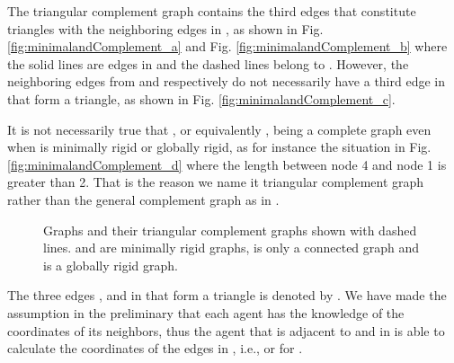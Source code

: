 \documentclass[times]{rncauth}
\begin{document}
 The
triangular complement graph  contains the third edges that
constitute triangles with the neighboring edges in , as shown in
 Fig. \ref{fig:minimalandComplement_a} and Fig.
\ref{fig:minimalandComplement_b} where the solid lines are edges in
 and the dashed lines belong to . However, the neighboring
edges from  and  respectively do not
  necessarily have a third edge in  that form a
  triangle, as shown in Fig. \ref{fig:minimalandComplement_c}.




It is not necessarily true that , or equivalently
, being a complete graph even when  is minimally rigid or
globally rigid, as for instance the situation in Fig.
\ref{fig:minimalandComplement_d} where the length between node 4 and
node 1 is greater than 2. That is the reason we name it triangular
complement graph rather than the general complement graph as in
\cite{Diestel10}.


\begin{figure}
\caption{Graphs and their triangular complement graphs shown with
dashed lines.  and  are minimally rigid graphs,  is
only a connected graph and  is a globally rigid
graph.}\label{fig:example_triangular}
\end{figure}


The three edges ,  and  in  that
form a triangle is denoted by . We have made
the assumption in the preliminary  that each agent has the knowledge
of the coordinates of its neighbors, thus the agent that is adjacent
to  and  in  is able to calculate the coordinates of
the edges  in , i.e.,  or
 for .
\end{document}
